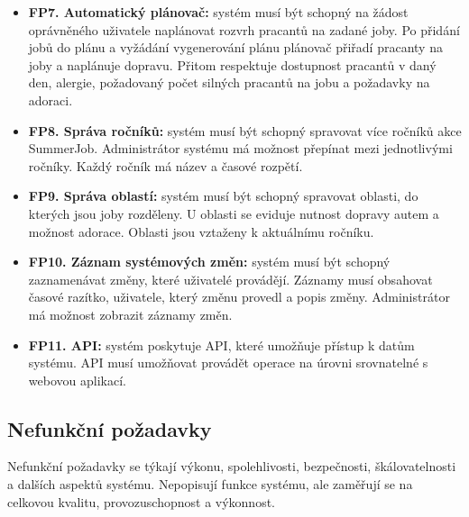 \begin{itemize}
    \item \textbf{FP7. Automatický plánovač:} systém musí být schopný na žádost oprávněného uživatele naplánovat rozvrh pracantů na zadané joby. Po přidání jobů do plánu a vyžádání vygenerování plánu plánovač přiřadí pracanty na joby a naplánuje dopravu. Přitom respektuje dostupnost pracantů v daný den, alergie, požadovaný počet silných pracantů na jobu a požadavky na adoraci.
    \item \textbf{FP8. Správa ročníků:} systém musí být schopný spravovat více ročníků akce SummerJob. Administrátor systému má možnost přepínat mezi jednotlivými ročníky. Každý ročník má název a časové rozpětí.
    \item \textbf{FP9. Správa oblastí:} systém musí být schopný spravovat oblasti, do kterých jsou joby rozděleny. U oblasti se eviduje nutnost dopravy autem a možnost adorace. Oblasti jsou vztaženy k aktuálnímu ročníku.
    \item \textbf{FP10. Záznam systémových změn:} systém musí být schopný zaznamenávat změny, které uživatelé provádějí. Záznamy musí obsahovat časové razítko, uživatele, který změnu provedl a popis změny. Administrátor má možnost zobrazit záznamy změn.
    \item \textbf{FP11. API:} systém poskytuje API, které umožňuje přístup k datům systému. API musí umožňovat provádět operace na úrovni srovnatelné s webovou aplikací.
\end{itemize}

\subsection{Nefunkční požadavky}

Nefunkční požadavky se týkají výkonu, spolehlivosti, bezpečnosti, škálovatelnosti a dalších aspektů systému. Nepopisují funkce systému, ale zaměřují se na celkovou kvalitu, provozuschopnost a výkonnost.

